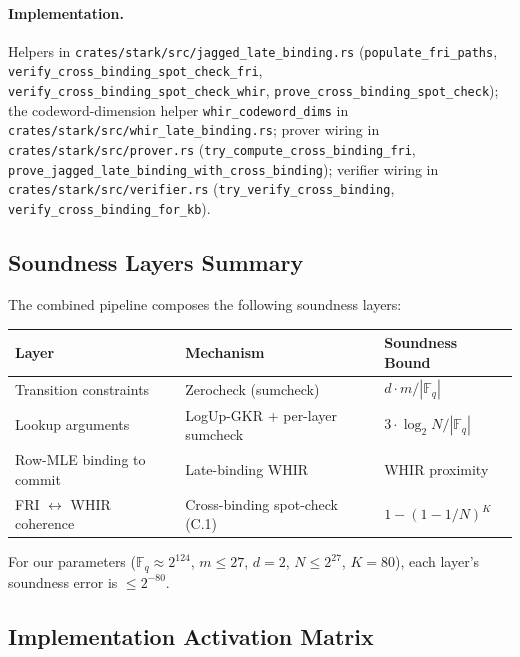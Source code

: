 \paragraph{Implementation.}
Helpers in
\texttt{crates/stark/src/jagged\_late\_binding.rs}
(\texttt{populate\_fri\_paths},
\texttt{verify\_cross\_binding\_spot\_check\_fri},
\texttt{verify\_cross\_binding\_spot\_check\_whir},
\texttt{prove\_cross\_binding\_spot\_check}); the codeword-dimension
helper \texttt{whir\_codeword\_dims} in
\texttt{crates/stark/src/whir\_late\_binding.rs}; prover wiring in
\texttt{crates/stark/src/prover.rs}
(\texttt{try\_compute\_cross\_binding\_fri},
\texttt{prove\_jagged\_late\_binding\_with\_cross\_binding});
verifier wiring in \texttt{crates/stark/src/verifier.rs}
(\texttt{try\_verify\_cross\_binding},
\texttt{verify\_cross\_binding\_for\_kb}).

\subsection{Soundness Layers Summary}

The combined pipeline composes the following soundness layers:

\begin{tabular}{@{}lll@{}}
\toprule
\textbf{Layer}                       & \textbf{Mechanism}            & \textbf{Soundness Bound} \\
\midrule
Transition constraints               & Zerocheck (sumcheck)          & $d \cdot m / |\mathbb{F}_q|$ \\
Lookup arguments                     & LogUp-GKR + per-layer sumcheck & $3 \cdot \log_2 N / |\mathbb{F}_q|$ \\
Row-MLE binding to commit            & Late-binding WHIR             & WHIR proximity \\
FRI $\leftrightarrow$ WHIR coherence  & Cross-binding spot-check (C.1) & $1 - (1 - 1/N)^K$ \\
\bottomrule
\end{tabular}

For our parameters ($\mathbb{F}_q \approx 2^{124}$, $m \leq 27$,
$d = 2$, $N \leq 2^{27}$, $K = 80$), each layer's soundness error is
$\leq 2^{-80}$.

\subsection{Implementation Activation Matrix}

